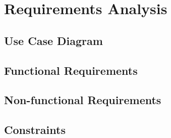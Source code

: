 \chapter{Requirements Analysis} \label{Requirements Analysis}
\section{Use Case Diagram}
\section{Functional Requirements}
\section{Non-functional Requirements}
\section{Constraints}